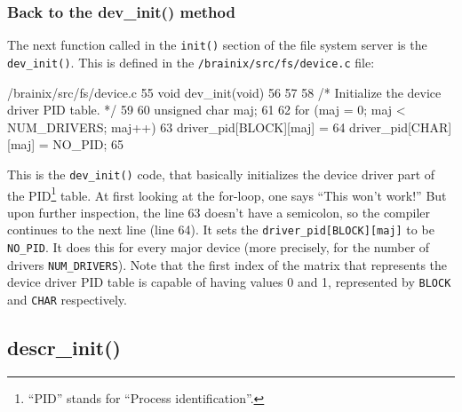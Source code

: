 \documentclass{article}
\begin{document}
\subsubsection{Back to the dev\_init() method}

The next function called in the \verb|init()| section of the file system server is the \verb|dev_init()|. This is defined in the \verb|/brainix/src/fs/device.c| file:
\begin{code}{/brainix/src/fs/device.c}
55 void dev_init(void)
56 {
57 
58 /* Initialize the device driver PID table. */
59 
60      unsigned char maj;
61 
62      for (maj = 0; maj < NUM_DRIVERS; maj++) 
63           driver_pid[BLOCK][maj] = 
64           driver_pid[CHAR][maj] = NO_PID;
65 }
\end{code}
This is the \verb|dev_init()| code, that basically initializes the device driver part of the PID\footnote{``PID'' stands for ``Process identification''.} table. At first looking at the for-loop, one says ``This won't work!'' But upon further inspection, the line 63 doesn't have a semicolon, so the compiler continues to the next line (line 64). It sets the \verb|driver_pid[BLOCK][maj]| to be \verb|NO_PID|. It does this for every major device (more precisely, for the number of drivers \verb|NUM_DRIVERS|). Note that the first index of the matrix that represents the device driver PID table is capable of having values 0 and 1, represented by \verb|BLOCK| and \verb|CHAR| respectively. 

\subsection{descr\_init()}
\end{document}
